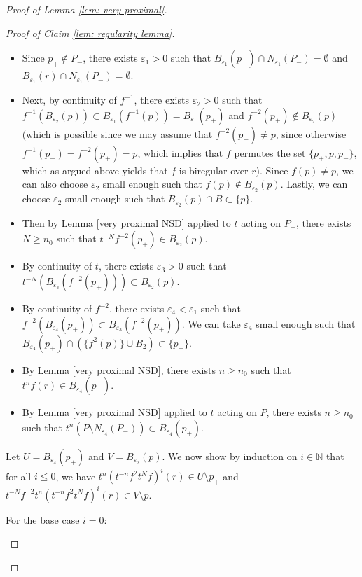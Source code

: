 \documentclass[12pt]{article}
\theoremstyle{definition}
\newcommand{\N}{\mathbb{N}}
\newcommand{\ve}{\varepsilon}
\begin{document}
\begin{proof} [Proof of Lemma \ref{lem: very proximal}]
\begin{proof}[Proof of Claim \ref{lem: regularity lemma}]
\begin{enumerate}
\begin{enumerate}
\begin{enumerate}
    \begin{itemize}
            \item Since $p_+ \notin P_-$, there exists $\ve_1 > 0$ such that $B_{\ve_1}(p_+) \cap N_{\ve_1}(P_-) = \emptyset$ and $B_{\ve_1}(r) \cap N_{\ve_1}(P_-) = \emptyset$.
            \item Next, by continuity of $f^{-1}$, there exists $\ve_2 > 0$ such that \newline $f^{-1}(B_{\ve_2}(p)) \subset B_{\ve_1}(f^{-1}(p)) = B_{\ve_1}(p_+)$ and $f^{-2}(p_+) \notin B_{\ve_2}(p)$ (which is possible since we may assume that $f^{-2}(p_+) \neq p$, since otherwise $f^{-1}(p_-)=f^{-2}(p_+) = p$, which implies that $f$ permutes the set $\{p_+, p, p_-\}$, which as argued above yields that $f$ is biregular over $r$). Since $f(p) \neq p$, we can also choose $\ve_2$ small enough such that $f(p) \notin B_{\ve_2}(p)$. Lastly, we can choose $\ve_2$ small enough such that $B_{\ve_2}(p) \cap B  \subset \{p\}$. 
            \item Then by Lemma \ref{very proximal NSD} applied to $t$ acting on $P_+$, there exists $N \geq n_0$ such that $t^{-N} f^{-2}(p_+) \in B_{\ve_2}(p)$.
            \item By continuity of $t$, there exists $\ve_3 > 0$ such that $t^{-N} (B_{\ve_3}(f^{-2}(p_+))) \subset B_{\ve_2}(p)$. 
            \item By continuity of $f^{-2}$, there exists $\ve_4 < \ve_1$ such that \newline $f^{-2}(B_{\ve_4}(p_+)) \subset B_{\ve_3}(f^{-2}(p_+))$. We can take $\ve_4$ small enough such that $B_{\ve_4}(p_+) \cap (\{f^2(p)\} \cup B_2)\subset \{p_+\}$. 
            \item By Lemma \ref{very proximal NSD}, there exists  $n \geq n_0$ such that $t^n f(r) \in B_{\ve_4}(p_+)$.
            \item By Lemma \ref{very proximal NSD} applied to $t$ acting on $P$, there exists $n \geq n_0$ such that $t^n(P \setminus N_{\ve_4}(P_-)) \subset B_{\ve_4}(p_+)$. 
        \end{itemize}
        
        Let $U = B_{\ve_4}(p_+)$ and $V = B_{\ve_2}(p)$. We now show by induction on $i \in \N$ that for all $i \leq 0$, we have $t^n (t^{-n}f^2t^Nf)^{i}(r) \in U \setminus p_+$ and $t^{-N}f^{-2}t^n (t^{-n}f^2t^Nf)^{i}(r) \in V \setminus p$.

        For the base case $i=0$: 


\end{enumerate}
\end{enumerate}
\end{enumerate}
\end{proof}
\end{proof}
\end{document}

